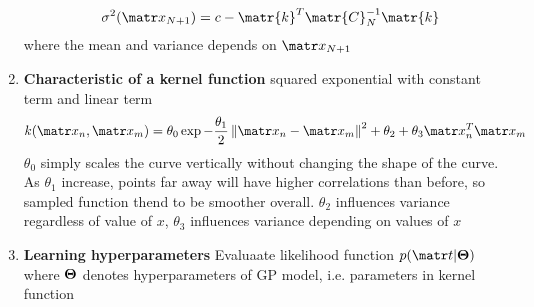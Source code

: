 \documentclass[11pt]{article}
\begin{document}
\begin{defn*}
\begin{enumerate}
\[            \quad 
            \sigma^2(\bx_{N+1}) = c - \matr{k}^T \matr{C}_N^{-1} \matr{k}
        \]
        where the mean and variance depends on $\bx_{N+1}$
        \item \textbf{Characteristic of a kernel function} squared exponential with constant term and linear term
        \[
            k(\bx_n, \bx_m) = \theta_0 \exp{-\frac{\theta_1}{2}\norm{\bx_n - \bx_m}^2} + \theta_2 + \theta_3 \bx_n^T \bx_m
        \]
        $\theta_0$ simply scales the curve vertically without changing the shape of the curve. As $\theta_1$ increase, points far away will have higher correlations than before, so sampled function thend to be smoother overall. $\theta_2$ influences variance regardless of value of $x$, $\theta_3$ influences variance depending on values of $x$
        \item \textbf{Learning hyperparameters} Evaluaate likelihood function  $p(\bt | \bTheta)$ where $\boldsymbol{\Theta}$ denotes hyperparameters of GP model, i.e. parameters in kernel function
    \end{enumerate}
\end{defn*}
\end{document}
